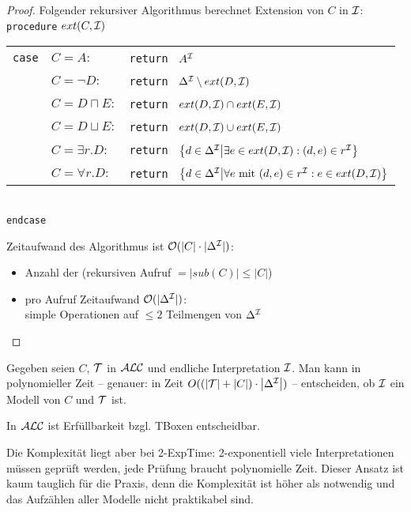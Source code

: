 \begin{proof}
    Folgender rekursiver Algorithmus berechnet Extension von $C$ in $\mathcal{I}$:\\
    \texttt{procedure} $ext(C, \mathcal{I})$\\
    \begin{tabular}{l l l}
        \texttt{case} & $C = A:$ & \texttt{return } $A^{\mathcal{I}}$\\
                      & $C = \neg D:$ & \texttt{return }
        $\Delta^{\mathcal{I}} \setminus ext(D, \mathcal{I})$\\
                      & $C = D \sqcap E:$ & \texttt{return }
        $ext(D, \mathcal{I}) \cap ext(E, \mathcal{I})$\\
                      & $C = D \sqcup E:$ & \texttt{return }
        $ext(D, \mathcal{I}) \cup ext(E, \mathcal{I})$\\
                      & $C = \exists r.D:$ & \texttt{return }
        $\left\{d\in \Delta^\MI \middle| \exists e\in ext(D, \MI) : (d, e) \in r^\MI\right\}$\\
                      & $C = \forall r.D:$ & \texttt{return }
        $\left\{d\in \Delta^\MI \middle| \forall e \text{ mit } (d, e) \in r^\MI : e\in ext(D, \MI)\right\}$\\
    \end{tabular}\\
    \texttt{endcase}

    Zeitaufwand des Algorithmus ist $\mathcal{O}(|C| \cdot |\Delta^{\mathcal{I}}|)$:
    \begin{itemize}
        \item Anzahl der (rekursiven Aufruf $= |sub(C)| \leq |C|$)
        \item pro Aufruf Zeitaufwand $\mathcal{O}(|\Delta^{\mathcal{I}}|)$: \\
            simple Operationen auf $\leq 2$ Teilmengen von $\Delta^{\mathcal{I}}$
    \end{itemize}
\end{proof}

\begin{korollar}
Gegeben seien $C$, $\mathcal{T}$ in $\mathcal{A}\mathcal{L}\mathcal{C}$ und endliche Interpretation $\mathcal{I}$. Man kann in polynomieller Zeit -- genauer: in Zeit $O(\left( \left| \MT \right| + \left| C \right| \right) \cdot \left| \Delta^\MI \right|)$ -- entscheiden, ob $\mathcal{I}$ ein Modell von $C$ und $\mathcal{T}$ ist.
\end{korollar}

\begin{theorem}
In $\mathcal{A}\mathcal{L}\mathcal{C}$ ist Erfüllbarkeit bzgl. TBoxen entscheidbar.
\end{theorem}

Die Komplexität liegt aber bei \textsf{2-ExpTime}: 2-exponentiell viele
Interpretationen müssen geprüft werden, jede Prüfung braucht polynomielle Zeit.
Dieser Ansatz ist kaum tauglich für die Praxis, denn die Komplexität ist höher
als notwendig und das Aufzählen aller Modelle nicht praktikabel sind.
